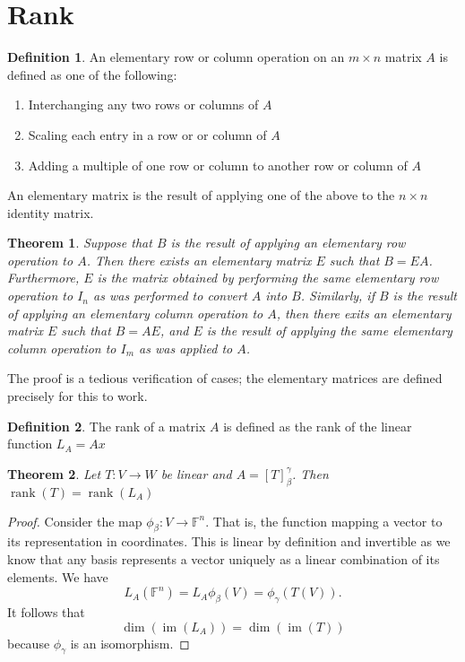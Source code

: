 \documentclass[oneside, 12pt]{book}
\DeclareMathOperator{\rank}{rank}
\DeclareMathOperator{\im}{im}
\newtheorem{thm}{Theorem}[section]
\theoremstyle{definition}
\newtheorem{defn}{Definition}[section]
\begin{document}
\section{Rank}
\begin{defn}
\label{defn_elmop}
  An elementary row or column operation on an $m \times n$ matrix $A$ is defined as one of the following:
  \begin{enumerate}
    \item Interchanging any two rows or columns of $A$
    \item Scaling each entry in a row or or column of $A$
    \item Adding a multiple of one row or column to another row or column of $A$
  \end{enumerate}
  An elementary matrix is the result of applying one of the above to the $n \times n$ identity matrix.
\end{defn}
\begin{thm}
\label{thm_elmop}
  Suppose that $B$ is the result of applying an elementary row operation to $A$. Then there exists an elementary matrix $E$ such that $B=EA$. Furthermore, $E$ is the matrix obtained by performing the same elementary row operation to $I_{n}$ as was performed to convert $A$ into $B$. Similarly, if $B$ is the result of applying
  an elementary column operation to $A$, then there exits an elementary matrix $E$ such that $B=AE$, and $E$ is the result of applying the same elementary column operation to $I_{m}$ as was applied to $A$.
\end{thm}
The proof is a tedious verification of cases; the elementary matrices are defined precisely for this to work.
\begin{defn}
\label{defn_rnk}
The rank of a matrix $A$ is defined as the rank of the linear function $L_{A}=Ax$
\end{defn}
\begin{thm}
\label{rnkeq}
  Let $T: V \to W$ be linear and $A=[T]_{\beta}^{\gamma}$. Then $\rank(T)=\rank(L_{A})$
\end{thm}
\begin{proof}
  Consider the map $\phi_{\beta}:V \to \mathbb{F}^{n}$. That is, the function mapping a vector to its representation in coordinates. This is linear by definition and invertible as we know that any basis represents a vector uniquely as a linear combination of its elements. We have
  \[L_{A}(\mathbb{F}^{n})=L_{A}\phi_{\beta}(V)=\phi_{\gamma}(T(V)).\] It follows that \[\dim(\im(L_{A}))=\dim(\im(T))\] because $\phi_{\gamma}$ is an isomorphism.
\end{proof}
\end{document}
